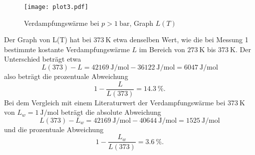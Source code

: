 \begin{figure}[h]
  \centering
  \texttt{[image: plot3.pdf]}
  \caption{Verdampfungswärme bei $p > \SI{1}{\bar}$, Graph $L(T)$}
  \label{fig:L}
\end{figure}

Der Graph von L(T) hat bei $\SI{373}{\kelvin}$ etwa denselben Wert, wie die
bei Messung 1 bestimmte kostante Verdampfungswärme $L$ im Bereich von
$\SI{273}{\kelvin}$ bis $\SI{373}{\kelvin}$.
Der Unterschied beträgt etwa
\begin{equation}
  L(373) - L = \SI{42169}{\joule\per\mol} - \SI{36122}{\joule\per\mol} =
  \SI{6047}{\joule\per\mol}
\end{equation}
also beträgt die prozentuale Abweichung
\begin{equation}
  1 - \frac{L}{L(373)} = \SI{14.3}{\percent} .
\end{equation}
Bei dem Vergleich mit einem Literaturwert der
Verdampfungswärme\cite{verdampfungswärme}
bei
$\SI{373}{\kelvin}$ von $L_w = \SI{1}{\joule\per\mol}$ beträgt die absolute
Abweichung
\begin{equation}
  L(373) - L_w = \SI{42169}{\joule\per\mol} - \SI{40644}{\joule\per\mol} =
  \SI{1525}{\joule\per\mol}
\end{equation}
und die prozentuale Abweichung
\begin{equation}
  1 - \frac{L_w}{L(373)} = \SI{3.6}{\percent} .
\end{equation}

\newpage
